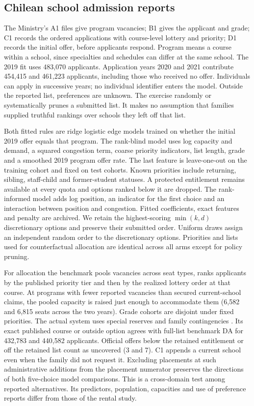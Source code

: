 \subsection{Chilean school admission reports}\label{app:sae}
The Ministry's A1 files give program vacancies; B1 gives the applicant and grade; C1 records the ordered applications with course-level lottery and priority; D1 records the initial offer, before applicants respond. Program means a course within a school, since specialties and schedules can differ at the same school. The 2019 fit uses 483,070 applicants. Application years 2020 and 2021 contribute 454,415 and 461,223 applicants, including those who received no offer. Individuals can apply in successive years; no individual identifier enters the model. Outside the reported list, preferences are unknown. The exercise randomly or systematically prunes a submitted list. It makes no assumption that families supplied truthful rankings over schools they left off that list.

Both fitted rules are ridge logistic edge models trained on whether the initial 2019 offer equals that program. The rank-blind model uses log capacity and demand, a squared congestion term, coarse priority indicators, list length, grade and a smoothed 2019 program offer rate. The last feature is leave-one-out on the training cohort and fixed on test cohorts. Known priorities include returning, sibling, staff-child and former-student statuses. A protected entitlement remains available at every quota and options ranked below it are dropped. The rank-informed model adds log position, an indicator for the first choice and an interaction between position and congestion. Fitted coefficients, exact features and penalty are archived. We retain the highest-scoring $\min(k,d)$ discretionary options and preserve their submitted order. Uniform draws assign an independent random order to the discretionary options. Priorities and lists used for counterfactual allocation are identical across all arms except for policy pruning.

For allocation the benchmark pools vacancies across seat types, ranks applicants by the published priority tier and then by the realized lottery order at that course. At programs with fewer reported vacancies than secured current-school claims, the pooled capacity is raised just enough to accommodate them (6,582 and 6,815 seats across the two years). Grade cohorts are disjoint under fixed priorities. The actual system uses special reserves and family contingencies \citep{correaschool,saereserve}. Its exact published course or outside option agrees with full-list benchmark DA for 432,783 and 440,582 applicants. Official offers below the retained entitlement or off the retained list count as uncovered (3 and 7). C1 appends a current school even when the family did not request it. Excluding placements at such administrative additions from the placement numerator preserves the directions of both five-choice model comparisons. This is a cross-domain test among reported alternatives. Its predictors, population, capacities and use of preference reports differ from those of the rental study.

